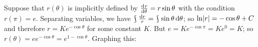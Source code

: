   \clearpage
\begin{ex}
  Suppose that $ r(\theta) $ is implicitly defined by $ \od{r}{\theta} = r \sin \theta $ with the condition $ r(\pi) = e $.
  Separating variables, we have $ \rint \frac{\dif{r}}{r} = \rint \sin \theta \dif{\theta} $; so $ \ln \abs{r} = -\cos \theta + C $
  and therefore $ r = Ke^{-\cos \theta} $ for some constant $ K $. But $ e = Ke^{-\cos \pi} = Ke^0 = K $; so $ r(\theta) = e e^{-\cos \theta} = e^{1 - \cos \theta} $.
  Graphing this:
  \begin{center}
  \end{center}
\end{ex}


